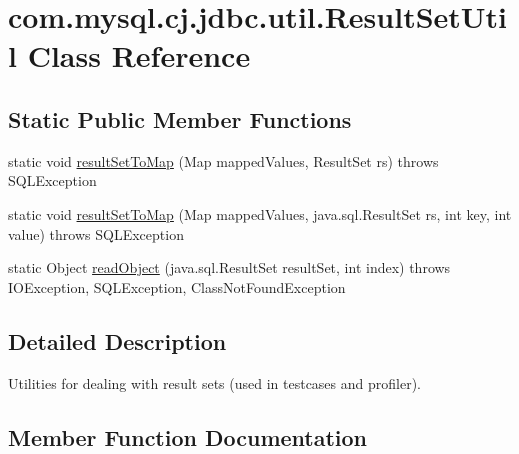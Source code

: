 \hypertarget{classcom_1_1mysql_1_1cj_1_1jdbc_1_1util_1_1_result_set_util}{}\section{com.\+mysql.\+cj.\+jdbc.\+util.\+Result\+Set\+Util Class Reference}
\label{classcom_1_1mysql_1_1cj_1_1jdbc_1_1util_1_1_result_set_util}
\subsection*{Static Public Member Functions}
\begin{DoxyCompactItemize}
\item 
static void \mbox{\hyperlink{classcom_1_1mysql_1_1cj_1_1jdbc_1_1util_1_1_result_set_util_acf321bd5feb37655a8377104b780f5d8}{result\+Set\+To\+Map}} (Map mapped\+Values, Result\+Set rs)  throws S\+Q\+L\+Exception 
\item 
static void \mbox{\hyperlink{classcom_1_1mysql_1_1cj_1_1jdbc_1_1util_1_1_result_set_util_a34585de68e6f5962152ed491eea9c1da}{result\+Set\+To\+Map}} (Map mapped\+Values, java.\+sql.\+Result\+Set rs, int key, int value)  throws S\+Q\+L\+Exception 
\item 
static Object \mbox{\hyperlink{classcom_1_1mysql_1_1cj_1_1jdbc_1_1util_1_1_result_set_util_a58cf5ba50434d76820d07ad65ce054eb}{read\+Object}} (java.\+sql.\+Result\+Set result\+Set, int index)  throws I\+O\+Exception, S\+Q\+L\+Exception, Class\+Not\+Found\+Exception 
\end{DoxyCompactItemize}


\subsection{Detailed Description}
Utilities for dealing with result sets (used in testcases and profiler). 

\subsection{Member Function Documentation}
\mbox{\label{classcom_1_1mysql_1_1cj_1_1jdbc_1_1util_1_1_result_set_util_a58cf5ba50434d76820d07ad65ce054eb}} 
